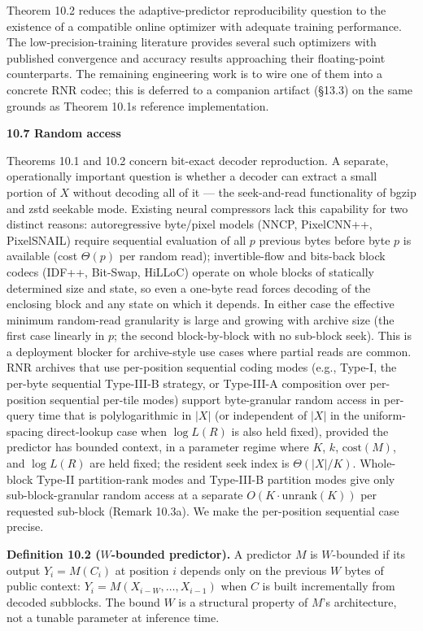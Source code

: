 \documentclass[
]{article}
\begin{document}
Theorem 10.2 reduces the adaptive-predictor reproducibility question to
the existence of a compatible online optimizer with adequate training
performance. The low-precision-training literature provides several such
optimizers with published convergence and accuracy results approaching
their floating-point counterparts. The remaining engineering work is to
wire one of them into a concrete RNR codec; this is deferred to a
companion artifact (§13.3) on the same grounds as Theorem
10.1\textquotesingle s reference implementation.

\textbf{10.7 Random access}

Theorems 10.1 and 10.2 concern bit-exact decoder reproduction. A
separate, operationally important question is whether a decoder can
extract a small portion of $X$ without decoding all of it --- the
seek-and-read functionality of bgzip and zstd seekable mode.
Existing neural compressors lack this capability for two distinct
reasons: autoregressive byte/pixel models (NNCP, PixelCNN++,
PixelSNAIL) require sequential evaluation of all $p$ previous bytes
before byte $p$ is available (cost $\Theta(p)$ per random read);
invertible-flow and bits-back block codecs (IDF++, Bit-Swap,
HiLLoC) operate on whole blocks of statically determined size and
state, so even a one-byte read forces decoding of the enclosing
block and any state on which it depends. In either case the
effective minimum random-read granularity is large and growing with
archive size (the first case linearly in $p$; the second
block-by-block with no sub-block seek). This is a deployment
blocker for archive-style use cases where partial reads are common.
RNR archives that use per-position sequential coding modes (e.g.,
Type-I, the per-byte sequential Type-III-B strategy, or Type-III-A
composition over per-position sequential per-tile modes) support
byte-granular random access in per-query time that is
polylogarithmic in $|X|$ (or independent of $|X|$ in the
uniform-spacing direct-lookup case when $\log L(R)$ is also
held fixed), provided the predictor has
bounded context, in a parameter regime where $K$, $k$,
$\mathrm{cost}(M)$, and $\log L(R)$ are held fixed; the resident
seek index is $\Theta(|X|/K)$. Whole-block Type-II partition-rank
modes and Type-III-B partition modes give only sub-block-granular
random access at a separate $O(K \cdot \mathrm{unrank}(K))$ per
requested sub-block (Remark 10.3a). We make the per-position
sequential case precise.

\textbf{Definition 10.2 ($W$-bounded predictor).} A predictor $M$ is
$W$-bounded if its output $Y_i = M(C_i)$ at position $i$ depends only
on the previous $W$ bytes of public context:
$Y_i = M(X_{i-W}, \ldots, X_{i-1})$ when $C$ is built incrementally
from decoded subblocks. The bound $W$ is a structural property of
$M$'s architecture, not a tunable parameter at inference time.
\end{document}
